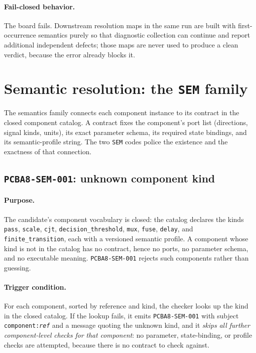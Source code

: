 \paragraph{Fail-closed behavior.} The board fails. Downstream resolution maps in the same run are built with first-occurrence semantics purely so that diagnostic collection can continue and report additional independent defects; those maps are never used to produce a clean verdict, because the error already blocks it.

\section{Semantic resolution: the \texttt{SEM} family}\label{ch07:sec:sem}

The semantics family connects each component instance to its contract in the closed component catalog. A contract fixes the component's port list (directions, signal kinds, units), its exact parameter schema, its required state bindings, and its semantic-profile string. The two \texttt{SEM} codes police the existence and the exactness of that connection.

\subsection{\texttt{PCBA8-SEM-001}: unknown component kind}\label{ch07:sub:sem001}

\paragraph{Purpose.} The candidate's component vocabulary is closed: the catalog declares the kinds \texttt{pass}, \texttt{scale}, \texttt{cjt}, \texttt{decision\_threshold}, \texttt{mux}, \texttt{fuse}, \texttt{delay}, and \texttt{finite\_transition}, each with a versioned semantic profile. A component whose kind is not in the catalog has no contract, hence no ports, no parameter schema, and no executable meaning. \texttt{PCBA8-SEM-001} rejects such components rather than guessing.

\paragraph{Trigger condition.} For each component, sorted by reference and kind, the checker looks up the kind in the closed catalog. If the lookup fails, it emits \texttt{PCBA8-SEM-001} with subject \texttt{component:\emph{ref}} and a message quoting the unknown kind, and it \emph{skips all further component-level checks for that component}: no parameter, state-binding, or profile checks are attempted, because there is no contract to check against.


